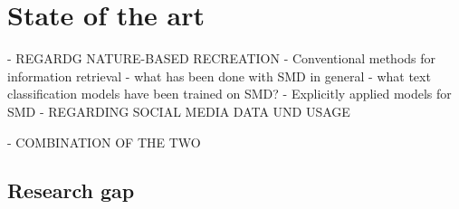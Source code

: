 \chapter{State of the art} \label{state_of_the_art}

    - REGARDG NATURE-BASED RECREATION
        - Conventional methods for information retrieval 
        - what has been done with SMD in general
        - what text classification models have been trained on SMD?
        - Explicitly applied models for SMD
    - REGARDING SOCIAL MEDIA DATA UND USAGE
    
    - COMBINATION OF THE TWO






\section{Research gap}